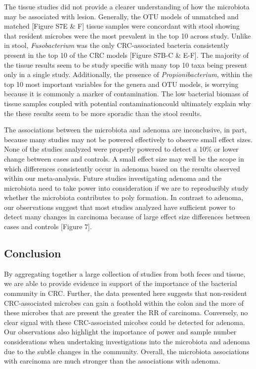 \documentclass[12pt,]{article}
\begin{document}
The tissue studies did not provide a clearer understanding of how the
microbiota may be associated with lesion. Generally, the OTU models of
unmatched and matched {[}Figure S7E \& F{]} tissue samples were
concordant with stool showing that resident microbes were the most
prevalent in the top 10 across study. Unlike in stool,
\emph{Fusobacterium} was the only CRC-associated bacteria consistently
present in the top 10 of the CRC models {[}Figure S7B-C \& E-F{]}. The
majority of the tissue results seem to be study specific with many top
10 taxa being present only in a single study. Additionally, the presence
of \emph{Propionibacterium}, within the top 10 most important variables
for the genera and OTU models, is worrying because it is commonly a
marker of contamination. The low bacterial biomass of tissue samples
coupled with potential contaminationcould ultimately explain why the
these results seem to be more sporadic than the stool results.

The associations between the microbiota and adenoma are inconclusive, in
part, because many studies may not be powered effectively to observe
small effect sizes. None of the studies analyzed were properly powered
to detect a 10\% or lower change between cases and controls. A small
effect size may well be the scope in which differences consistently
occur in adenoma based on the results observed within our meta-analysis.
Future studies investigating adenoma and the microbiota need to take
power into consideration if we are to reproducibly study whether the
microbiota contributes to poly formation. In contrast to adenoma, our
observations suggest that most studies analyzed have sufficient power to
detect many changes in carcinoma because of large effect size
differences between cases and controls {[}Figure 7{]}.

\newpage

\subsection{Conclusion}\label{conclusion}

By aggregating together a large collection of studies from both feces
and tissue, we are able to provide evidence in support of the importance
of the bacterial community in CRC. Further, the data presented here
suggests that non-resident CRC-associated microbes can gain a foothold
within the colon and the more of these microbes that are present the
greater the RR of carcinoma. Conversely, no clear signal with these
CRC-associated micobes could be detected for adenoma. Our observations
also highlight the importance of power and sample number considerations
when undertaking investigations into the microbiota and adenoma due to
the subtle changes in the community. Overall, the microbiota
associations with carcinoma are much stronger than the associations with
adenoma.
\end{document}
